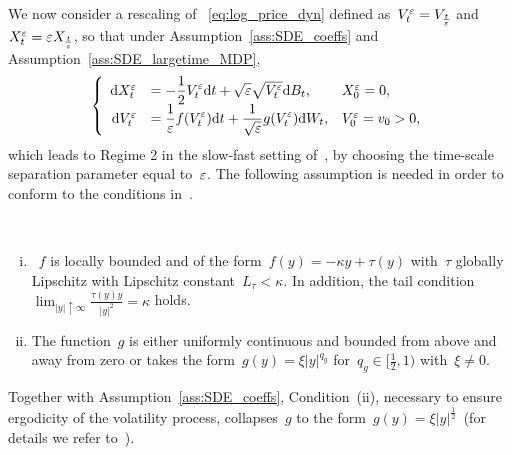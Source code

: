 We now consider a rescaling of ~\eqref{eq:log_price_dyn}
defined as~$V_t^\varepsilon = V_{\frac{t}{\varepsilon}}$ and~$X_t^\varepsilon = \varepsilon X_{\frac{t}{\varepsilon}}$, so that under Assumption~\ref{ass:SDE_coeffs} and Assumption~\ref{ass:SDE_largetime_MDP},
\begin{equation}\label{eq:large_time_MD_dynamics}
\left\{
\begin{array}{rll}
\mathrm{d} X^\varepsilon_t &= \displaystyle -\frac{1}{2}V_t^\varepsilon \mathrm{d} t + \sqrt{\varepsilon}\sqrt{V_t^\varepsilon}\mathrm{d} B_t, 
& X_0^\varepsilon = 0,\\
\mathrm{d} V_t^\varepsilon &= \displaystyle \frac{1}{\varepsilon}f(V_t^\varepsilon)\mathrm{d} t + \frac{1}{\sqrt{\varepsilon}}g(V_t^\varepsilon)\mathrm{d} W_t, 
& V_0^\varepsilon = v_0>0,
\end{array}
\right.\end{equation}
which leads to Regime 2 in the slow-fast setting of~\cite[Theorem 2.1]{Morse2017ModerateDiffusions}, 
by choosing the time-scale separation parameter equal to~$\varepsilon$. The following assumption is needed in order to conform to the conditions in~\cite{Morse2017ModerateDiffusions}.
\begin{assumption}\label{ass:SDE_largetime_MDP}\
\begin{enumerate}[(i)]
    \item~$f$ is locally bounded and of the form~$f(y) = -\kappa y +\tau(y)$ with~$\tau$ globally Lipschitz with Lipschitz constant~$L_{\tau}<\kappa$. In addition, the tail condition~${\lim_{|y| \uparrow\infty}\frac{\tau(y)y}{|y|^2} = \kappa}$ holds.
    \item The function~$g$ is either uniformly continuous and bounded from above and away from zero or takes the form~$g(y) = \xi |y|^{q_g}$ for~$q_g \in [\frac{1}{2},1)$ with~$\xi\ne 0$.
\end{enumerate}
\end{assumption}
\begin{remark}
Together with Assumption~\ref{ass:SDE_coeffs}, 
Condition~(ii), necessary to ensure ergodicity of the volatility process, collapses~$g$ to the form~$g(y)=\xi |y|^\frac{1}{2}\,$ (for details we refer to~\cite{Jacquier2019PathwisePricing,Morse2017ModerateDiffusions}).
\end{remark}

